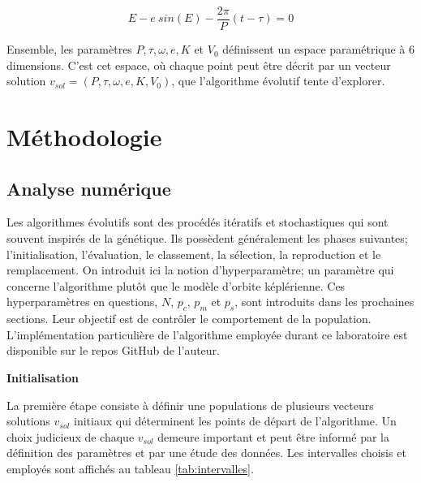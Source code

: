 \documentclass{article}
\begin{document}
\begin{equation}\label{eq:E}
	E - e\ sin(E) - \frac{2 \pi}{P}(t - \tau)=0 
\end{equation}

Ensemble, les paramètres $P, \tau, \omega, e, K$ et $V_0$ définissent un espace paramétrique à 6 dimensions. C'est cet espace, 
où chaque point peut être décrit par un vecteur solution $v_{sol} = (P, \tau, \omega, e, K, V_0)$, que l'algorithme évolutif tente d'explorer.

\section{Méthodologie}\label{sec:methodologie}


\subsection{Analyse numérique}\label{subsec:analyse_numerique}

Les algorithmes évolutifs sont des procédés itératifs et stochastiques qui sont souvent inspirés de la génétique. Ils possèdent généralement les phases suivantes; l'initialisation, l'évaluation, le classement, la sélection, la reproduction et le remplacement. On introduit ici la notion d'hyperparamètre; un paramètre qui concerne l'algorithme plutôt que le modèle d'orbite képlérienne. Ces hyperparamètres en questions, $N$, $p_c$, $p_m$ et $p_s$, sont introduits dans les prochaines sections. Leur objectif est de contrôler le comportement de la population. L'implémentation particulière de l'algorithme employée durant ce laboratoire est disponible sur le repos GitHub de l'auteur\cite{github}.

\vspace{0.3cm}
\noindent\textbf{Initialisation}

La première étape consiste à définir une populations de plusieurs vecteurs solutions $v_{sol}$ initiaux qui déterminent les points de départ de l'algorithme. Un choix judicieux de chaque $v_{sol}$ demeure important et peut être informé par la définition des paramètres et par une étude des données. Les intervalles choisis et employés sont affichés au tableau \ref{tab:intervalles}.
\end{document}
